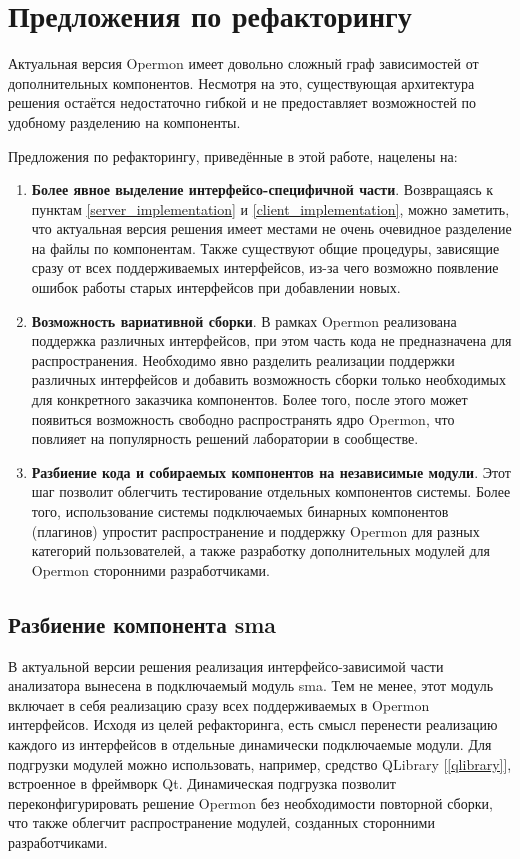 \section{Предложения по рефакторингу}

Актуальная версия Opermon имеет довольно сложный граф зависимостей от дополнительных компонентов. Несмотря на это, существующая архитектура решения остаётся недостаточно гибкой и не предоставляет возможностей по удобному разделению на компоненты.

Предложения по рефакторингу, приведённые в этой работе, нацелены на:

\begin{enumerate}
 \item \textbf{Более явное выделение интерфейсо-специфичной части}. Возвращаясь к пунктам \ref{server_implementation} и \ref{client_implementation}, можно заметить, что актуальная версия решения имеет местами не очень очевидное разделение на файлы по компонентам. Также существуют общие процедуры, зависящие сразу от всех поддерживаемых интерфейсов, из-за чего возможно появление ошибок работы старых интерфейсов при добавлении новых.
 \item \textbf{Возможность вариативной сборки}. В рамках Opermon реализована поддержка различных интерфейсов, при этом часть кода не предназначена для распространения. Необходимо явно разделить реализации поддержки различных интерфейсов и добавить возможность сборки только необходимых для конкретного заказчика компонентов. Более того, после этого может появиться возможность свободно распространять ядро Opermon, что повлияет на популярность решений лаборатории в сообществе.
 \item \textbf{Разбиение кода и собираемых компонентов на независимые модули}. Этот шаг позволит облегчить тестирование отдельных компонентов системы. Более того, использование системы подключаемых бинарных компонентов (плагинов) упростит распространение и поддержку Opermon для разных категорий пользователей, а также разработку дополнительных модулей для Opermon сторонними разработчиками.
\end{enumerate}

\subsection {Разбиение компонента sma}

В актуальной версии решения реализация интерфейсо-зависимой части анализатора вынесена в подключаемый модуль sma. Тем не менее, этот модуль включает в себя реализацию сразу всех поддерживаемых в Opermon интерфейсов. Исходя из целей рефакторинга, есть смысл перенести реализацию каждого из интерфейсов в отдельные динамически подключаемые модули. Для подгрузки модулей можно использовать, например, средство QLibrary [\ref{qlibrary}], встроенное в фреймворк Qt. Динамическая подгрузка позволит переконфигурировать решение Opermon без необходимости повторной сборки, что также облегчит распространение модулей, созданных сторонними разработчиками.

